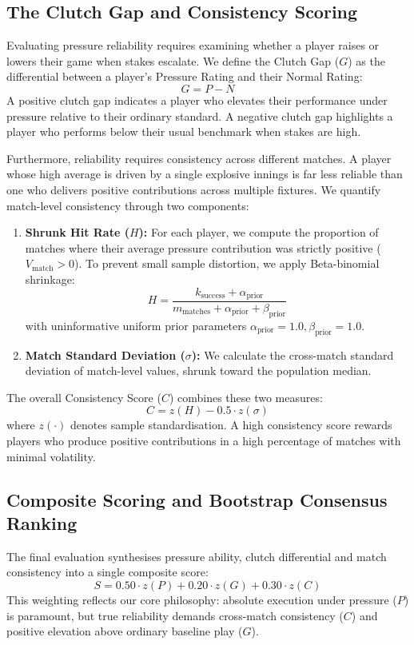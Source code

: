 \documentclass[11pt,a4paper]{article}
\begin{document}
\subsection{The Clutch Gap and Consistency Scoring}
Evaluating pressure reliability requires examining whether a player raises or lowers their game when stakes escalate. We define the Clutch Gap ($G$) as the differential between a player's Pressure Rating and their Normal Rating:
\begin{equation}
    G = P - N
\end{equation}
A positive clutch gap indicates a player who elevates their performance under pressure relative to their ordinary standard. A negative clutch gap highlights a player who performs below their usual benchmark when stakes are high.

Furthermore, reliability requires consistency across different matches. A player whose high average is driven by a single explosive innings is far less reliable than one who delivers positive contributions across multiple fixtures. We quantify match-level consistency through two components:
\begin{enumerate}
    \item \textbf{Shrunk Hit Rate ($H$):} For each player, we compute the proportion of matches where their average pressure contribution was strictly positive ($V_{\text{match}} > 0$). To prevent small sample distortion, we apply Beta-binomial shrinkage:
    \begin{equation}
        H = \frac{k_{\text{success}} + \alpha_{\text{prior}}}{m_{\text{matches}} + \alpha_{\text{prior}} + \beta_{\text{prior}}}
    \end{equation}
    with uninformative uniform prior parameters $\alpha_{\text{prior}} = 1.0, \beta_{\text{prior}} = 1.0$.
    \item \textbf{Match Standard Deviation ($\sigma$):} We calculate the cross-match standard deviation of match-level values, shrunk toward the population median.
\end{enumerate}
The overall Consistency Score ($C$) combines these two measures:
\begin{equation}
    C = z(H) - 0.5 \cdot z(\sigma)
\end{equation}
where $z(\cdot)$ denotes sample standardisation. A high consistency score rewards players who produce positive contributions in a high percentage of matches with minimal volatility.

\subsection{Composite Scoring and Bootstrap Consensus Ranking}
The final evaluation synthesises pressure ability, clutch differential and match consistency into a single composite score:
\begin{equation}
    S = 0.50 \cdot z(P) + 0.20 \cdot z(G) + 0.30 \cdot z(C)
\end{equation}
This weighting reflects our core philosophy: absolute execution under pressure ($P$) is paramount, but true reliability demands cross-match consistency ($C$) and positive elevation above ordinary baseline play ($G$).
\end{document}
